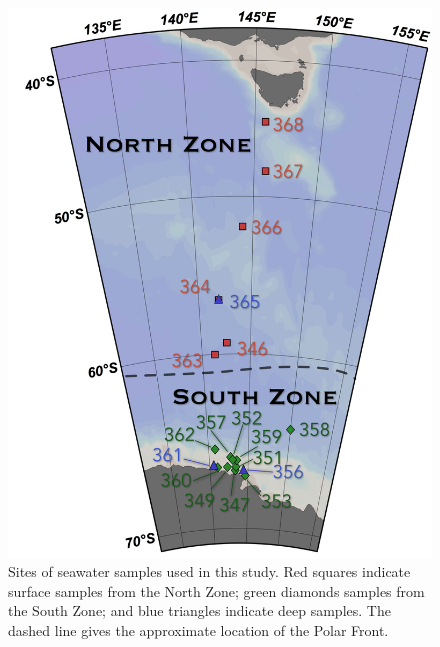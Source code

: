 \begin{figure}
  \centering
  \includegraphics[width=\textwidth]{../polarfront/samplemap.png}
  \caption{Sites of seawater samples used in this study. Red squares indicate surface samples from the North Zone; green diamonds samples from the South Zone; and blue triangles indicate deep samples. The dashed line gives the approximate location of the Polar Front.}
  \label{fig:samplemap}
\end{figure}
